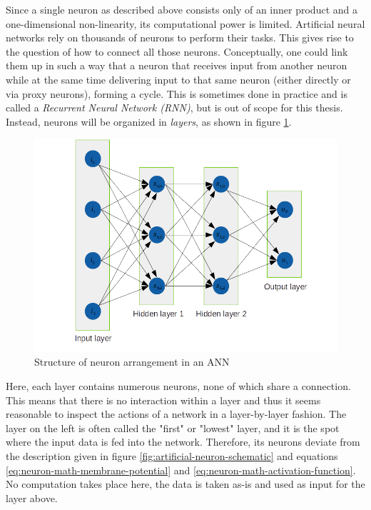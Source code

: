 \documentclass[11pt, a4paper]{article}
\begin{document}
Since a single neuron as described above consists only of an inner product and a one-dimensional non-linearity, its computational power is limited. Artificial neural networks rely on thousands of neurons to perform their tasks. This gives rise to the question of how to connect all those neurons. Conceptually, one could link them up in such a way that a neuron that receives input from another neuron while at the same time delivering input to that same neuron (either directly or via proxy neurons), forming a cycle. This is sometimes done in practice and is called a \emph{Recurrent Neural Network (RNN)}, but is out of scope for this thesis. Instead, neurons will be organized in \emph{layers}, as shown in figure \ref{fig:neural-nework-structure}. %

\begin{figure}[htp]
\centering
\includegraphics[width=\textwidth]{images/network_layout.png}
\caption{Structure of neuron arrangement in an ANN}
\label{fig:neural-nework-structure}
\end{figure}

Here, each layer contains numerous neurons, none of which share a connection. This means that there is no interaction within a layer and thus it seems reasonable to inspect the actions of a network in a layer-by-layer fashion. The layer on the left is often called the "first" or "lowest" layer, and it is the spot where the input data is fed into the network. Therefore, its neurons deviate from the description given in figure \ref{fig:artificial-neuron-schematic} and equations \eqref{eq:neuron-math-membrane-potential} and \eqref{eq:neuron-math-activation-function}. No computation takes place here, the data is taken as-is and used as input for the layer above.
\end{document}
